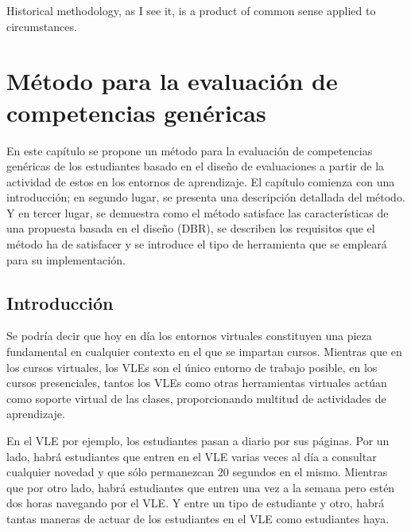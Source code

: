 

\begin{savequote}[50mm]
Historical methodology, as I see it, is a product of common sense applied to circumstances. 
\end{savequote}


\chapter{Método para la evaluación de competencias genéricas}
\label{cha:Overall methodology}

\ifpdf
    \graphicspath{{4_overall_methodology/figures/PNG/}{4_overall_methodology/figures/PDF/}{4_overall_methodology/figures/}}
\else
    \graphicspath{{4_overall_methodology/figures/EPS/}{4_overall_methodology/figures/}}
\fi


En este capítulo se propone un método para la evaluación de competencias genéricas de los estudiantes basado en el diseño de evaluaciones a partir de la actividad de estos en los entornos de aprendizaje. El capítulo comienza con una introducción; en segundo lugar, se presenta una descripción detallada del método. Y en tercer lugar, se demuestra como el método satisface las características de una propuesta basada en el diseño (DBR), se describen los requisitos que el método ha de satisfacer y se introduce el tipo de herramienta que se empleará para su implementación.

\section{Introducción}

Se podría decir que hoy en día los entornos virtuales constituyen una pieza fundamental en cualquier contexto en el que se impartan cursos. Mientras que en los cursos virtuales, los VLEs son el único entorno de trabajo posible, en los cursos presenciales, tantos los VLEs como otras herramientas virtuales actúan como soporte virtual de las clases, proporcionando multitud de actividades de aprendizaje. 

En el VLE por ejemplo, los estudiantes pasan a diario por sus páginas. Por un lado, habrá estudiantes que entren en el VLE varias veces al día a consultar cualquier novedad y que sólo permanezcan 20 segundos en el mismo. Mientras que por otro lado, habrá estudiantes que entren una vez a la semana pero estén dos horas navegando por el VLE. Y entre un tipo de estudiante y otro, habrá tantas maneras de actuar de los estudiantes en el VLE como estudiantes haya. 

